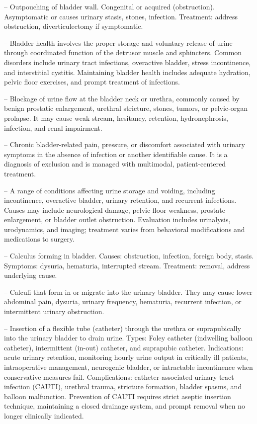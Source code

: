 -- Outpouching of bladder wall. Congenital or acquired (obstruction). Asymptomatic or causes urinary stasis, stones, infection. Treatment: address obstruction, diverticulectomy if symptomatic.

-- Bladder health involves the proper storage and voluntary release of urine through coordinated function of the detrusor muscle and sphincters. Common disorders include urinary tract infections, overactive bladder, stress incontinence, and interstitial cystitis. Maintaining bladder health includes adequate hydration, pelvic floor exercises, and prompt treatment of infections.

-- Blockage of urine flow at the bladder neck or urethra, commonly caused by benign prostatic enlargement, urethral stricture, stones, tumors, or pelvic-organ prolapse. It may cause weak stream, hesitancy, retention, hydronephrosis, infection, and renal impairment.

-- Chronic bladder-related pain, pressure, or discomfort associated with urinary symptoms in the absence of infection or another identifiable cause. It is a diagnosis of exclusion and is managed with multimodal, patient-centered treatment.

-- A range of conditions affecting urine storage and voiding, including incontinence, overactive bladder, urinary retention, and recurrent infections. Causes may include neurological damage, pelvic floor weakness, prostate enlargement, or bladder outlet obstruction. Evaluation includes urinalysis, urodynamics, and imaging; treatment varies from behavioral modifications and medications to surgery.

-- Calculus forming in bladder. Causes: obstruction, infection, foreign body, stasis. Symptoms: dysuria, hematuria, interrupted stream. Treatment: removal, address underlying cause.

-- Calculi that form in or migrate into the urinary bladder. They may cause lower abdominal pain, dysuria, urinary frequency, hematuria, recurrent infection, or intermittent urinary obstruction.

-- Insertion of a flexible tube (catheter) through the urethra or suprapubically into the urinary bladder to drain urine. Types: Foley catheter (indwelling balloon catheter), intermittent (in-out) catheter, and suprapubic catheter. Indications: acute urinary retention, monitoring hourly urine output in critically ill patients, intraoperative management, neurogenic bladder, or intractable incontinence when conservative measures fail. Complications: catheter-associated urinary tract infection (CAUTI), urethral trauma, stricture formation, bladder spasms, and balloon malfunction. Prevention of CAUTI requires strict aseptic insertion technique, maintaining a closed drainage system, and prompt removal when no longer clinically indicated.

